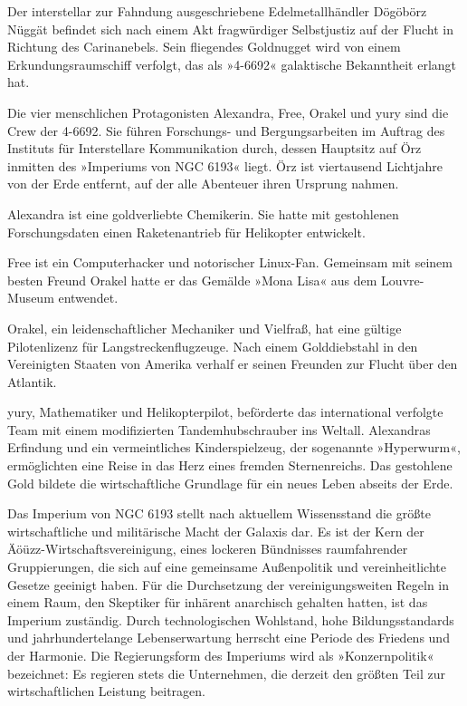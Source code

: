 
Der interstellar zur Fahndung ausgeschriebene Edelmetallhändler Dögöbörz Nüggät befindet sich nach einem Akt fragwürdiger Selbstjustiz auf der Flucht in Richtung des Carinanebels. Sein fliegendes Goldnugget wird von einem Erkundungsraumschiff verfolgt, das als »4-6692« galaktische Bekanntheit erlangt hat.

\bigskip

\noindent Die vier menschlichen Protagonisten Alexandra, Free, Orakel und yury sind die Crew der 4-6692. Sie führen Forschungs- und Bergungsarbeiten im Auftrag des Instituts für Interstellare Kommunikation durch, dessen Hauptsitz auf Örz inmitten des »Imperiums von NGC 6193« liegt. Örz ist viertausend Lichtjahre von der Erde entfernt, auf der alle Abenteuer ihren Ursprung nahmen.

Alexandra ist eine goldverliebte Chemikerin. Sie hatte mit gestohlenen Forschungsdaten einen Raketenantrieb für Helikopter entwickelt.

Free ist ein Computerhacker und notorischer Linux-Fan. Gemeinsam mit seinem besten Freund Orakel hatte er das Gemälde »Mona Lisa« aus dem Louvre-Museum entwendet.

Orakel, ein leidenschaftlicher Mechaniker und Vielfraß, hat eine gültige Pilotenlizenz für Langstreckenflugzeuge. Nach einem Golddiebstahl in den Vereinigten Staaten von Amerika verhalf er seinen Freunden zur Flucht über den Atlantik.

yury, Mathematiker und Helikopterpilot, beförderte das international verfolgte Team mit einem modifizierten Tandemhubschrauber ins Weltall. Alexandras Erfindung und ein vermeintliches Kinderspielzeug, der sogenannte »Hyperwurm«, ermöglichten eine Reise in das Herz eines fremden Sternenreichs. Das gestohlene Gold bildete die wirtschaftliche Grundlage für ein neues Leben abseits der Erde.

\bigskip

\noindent Das Imperium von NGC 6193 stellt nach aktuellem Wissensstand die größte wirtschaftliche und militärische Macht der Galaxis dar. Es ist der Kern der Äöüzz-Wirtschaftsvereinigung, eines lockeren Bündnisses raumfahrender Gruppierungen, die sich auf eine gemeinsame Außenpolitik und vereinheitlichte Gesetze geeinigt haben. Für die Durchsetzung der vereinigungsweiten Regeln in einem Raum, den Skeptiker für inhärent anarchisch gehalten hatten, ist das Imperium zuständig. Durch technologischen Wohlstand, hohe Bildungsstandards und jahrhundertelange Lebenserwartung herrscht eine Periode des Friedens und der Harmonie. Die Regierungsform des Imperiums wird als »Konzernpolitik« bezeichnet: Es regieren stets die Unternehmen, die derzeit den größten Teil zur wirtschaftlichen Leistung beitragen.

